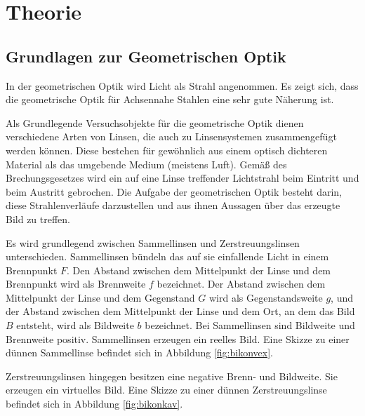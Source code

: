 \section{Theorie}
\label{sec:Theorie}

\subsection{Grundlagen zur Geometrischen Optik}
\label{subsec:Grundlagen}
In der geometrischen Optik wird Licht als Strahl angenommen. Es zeigt sich, dass
die geometrische Optik für Achsennahe Stahlen eine sehr gute Näherung ist.

Als Grundlegende Versuchsobjekte für die geometrische Optik dienen verschiedene Arten von Linsen, die
auch zu Linsensystemen zusammengefügt werden können. Diese bestehen für gewöhnlich aus einem optisch
dichteren Material als das umgebende Medium (meistens Luft). Gemäß des Brechungsgesetzes wird
ein auf eine Linse treffender Lichtstrahl beim Eintritt und beim Austritt gebrochen. Die Aufgabe
der geometrischen Optik besteht darin, diese Strahlenverläufe darzustellen und aus ihnen
Aussagen über das erzeugte Bild zu treffen.

Es wird grundlegend zwischen Sammellinsen und Zerstreuungslinsen unterschieden. Sammellinsen bündeln
das auf sie einfallende Licht in einem Brennpunkt $F$. Den Abstand zwischen dem Mittelpunkt
der Linse und dem Brennpunkt wird als Brennweite $f$ bezeichnet. Der Abstand zwischen dem
Mittelpunkt der Linse und dem Gegenstand $G$ wird als Gegenstandsweite $g$, und der Abstand
zwischen dem Mittelpunkt der Linse und dem Ort, an dem das Bild $B$ entsteht, wird als
Bildweite $b$ bezeichnet. Bei Sammellinsen sind Bildweite und Brennweite positiv.
Sammellinsen erzeugen ein reelles Bild. Eine Skizze zu einer dünnen Sammellinse befindet sich in Abbildung
\ref{fig:bikonvex}.

Zerstreuungslinsen hingegen besitzen eine negative Brenn- und Bildweite. Sie erzeugen ein
virtuelles Bild. Eine Skizze zu einer dünnen Zerstreuungslinse befindet sich in Abbildung
\ref{fig:bikonkav}.

